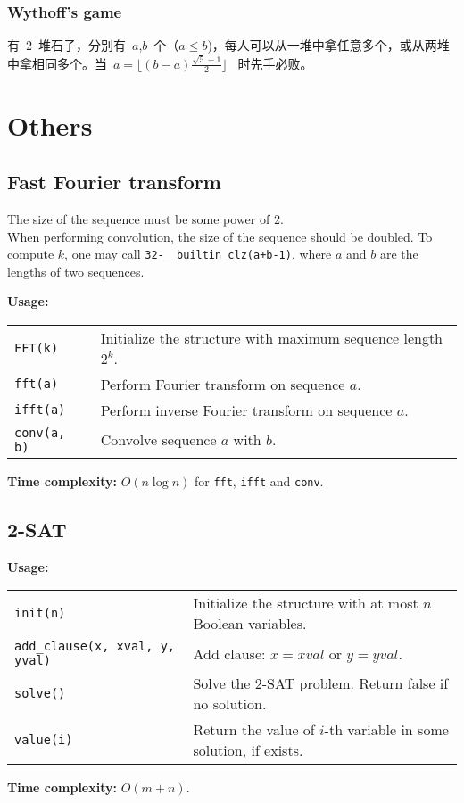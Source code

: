 \subsubsection{Wythoff's game}
有~2~堆石子，分别有~$a$,$b$~个（$a \leq b$)，每人可以从一堆中拿任意多个，或从两堆中拿相同多个。当~$a = \lfloor (b-a)\frac{\sqrt{5}+1}{2} \rfloor$~ 时先手必败。

\section{Others}
\subsection{Fast Fourier transform}
\Warning The size of the sequence must be some power of 2. \\
\Warning When performing convolution, the size of the sequence should be doubled. To compute $k$, one may call \lstinline|32-__builtin_clz(a+b-1)|, where $a$ and $b$ are the lengths of two sequences.  \par
\textbf{Usage:} \\[0.1cm]
\begin{tabular}{p{2cm} p{9.5cm}}
  \lstinline|FFT(k)| & Initialize the structure with maximum sequence length $2^k$. \\
  \lstinline|fft(a)| & Perform Fourier transform on sequence $a$.  \\
  \lstinline|ifft(a)| & Perform inverse Fourier transform on sequence $a$. \\
  \lstinline|conv(a, b)| & Convolve sequence $a$ with $b$. \\
\end{tabular} \par
\textbf{Time complexity:} $O(n \log n)$ for \lstinline|fft|, \lstinline|ifft| and \lstinline|conv|. \par


\subsection{2-SAT}
\textbf{Usage:} \\[0.1cm]
\begin{tabular}{p{2.5cm} p{9cm}}
  \lstinline|init(n)| & Initialize the structure with at most $n$ Boolean variables. \\
  \lstinline|add_clause(x, xval, y, yval)| & Add clause: $x = xval$ or $y = yval$.  \\
  \lstinline|solve()| & Solve the 2-SAT problem. Return false if no solution. \\
  \lstinline|value(i)| & Return the value of $i$-th variable in some solution, if exists. \\
\end{tabular} \par
\textbf{Time complexity:} $O(m+n)$. \par


